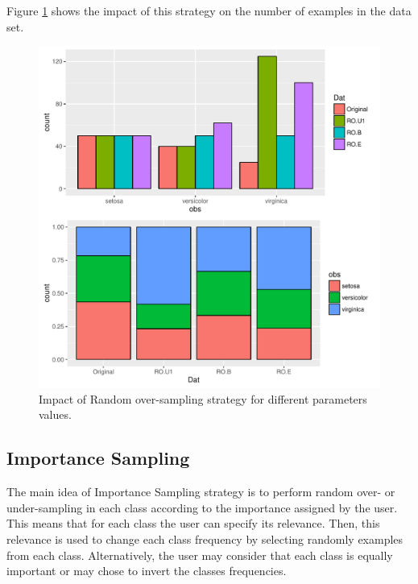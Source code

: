 \documentclass[10pt,a4paper]{article}\usepackage[]{graphicx}\usepackage[]{color}
\makeatletter
\def\maxwidth{ %
  \ifdim\Gin@nat@width>\linewidth
    \linewidth
  \else
    \Gin@nat@width
  \fi
}
\newenvironment{knitrout}{}{} %
\makeatother
\begin{document}
Figure \ref{fig:Iris_RO2} shows the impact of this strategy on the number of examples in the data set.

\begin{knitrout}\footnotesize
{}\color{fgcolor}\begin{figure}

{\centering \includegraphics[width=\maxwidth]{figures/UBL-Iris_RO2-1} 

}

\caption[Impact of Random over-sampling strategy for different parameters values]{Impact of Random over-sampling strategy for different parameters values.}\label{fig:Iris_RO2}
\end{figure}


\end{knitrout}

\subsection{Importance Sampling}\label{sec:ISClassif}

The main idea of Importance Sampling strategy is to perform random over- or under-sampling in each class according to the importance assigned by the user. This means that for each class the user can specify its relevance. Then, this relevance is used to change each class frequency by selecting randomly examples from each class. Alternatively, the user may consider that each class is equally important or may chose to invert the classes frequencies.
\end{document}

